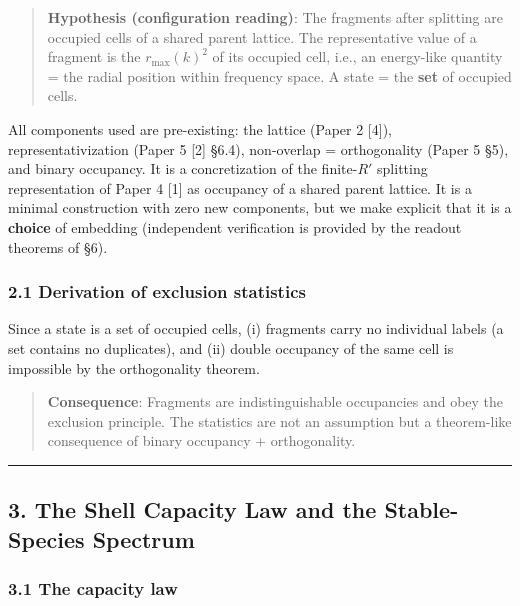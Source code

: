 \documentclass[
]{article}
\begin{document}
\begin{quote}
\textbf{Hypothesis (configuration reading)}: The fragments after
splitting are occupied cells of a shared parent lattice. The
representative value of a fragment is the \(r_{\max}(k)^2\) of its
occupied cell, i.e., an energy-like quantity = the radial position
within frequency space. A state = the \textbf{set} of occupied cells.
\end{quote}

All components used are pre-existing: the lattice (Paper 2 {[}4{]}),
representativization (Paper 5 {[}2{]} §6.4), non-overlap = orthogonality
(Paper 5 §5), and binary occupancy. It is a concretization of the
finite-\(R'\) splitting representation of Paper 4 {[}1{]} as occupancy
of a shared parent lattice. It is a minimal construction with zero new
components, but we make explicit that it is a \textbf{choice} of
embedding (independent verification is provided by the readout theorems
of §6).

\subsubsection{2.1 Derivation of exclusion
statistics}\label{derivation-of-exclusion-statistics}

Since a state is a set of occupied cells, (i) fragments carry no
individual labels (a set contains no duplicates), and (ii) double
occupancy of the same cell is impossible by the orthogonality theorem.

\begin{quote}
\textbf{Consequence}: Fragments are indistinguishable occupancies and
obey the exclusion principle. The statistics are not an assumption but a
theorem-like consequence of binary occupancy + orthogonality.
\end{quote}

\begin{center}\rule{0.5\linewidth}{0.5pt}\end{center}

\subsection{3. The Shell Capacity Law and the Stable-Species
Spectrum}\label{the-shell-capacity-law-and-the-stable-species-spectrum}

\subsubsection{3.1 The capacity law}\label{the-capacity-law}
\end{document}
